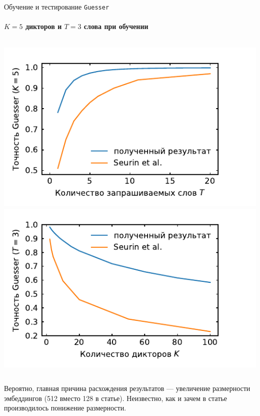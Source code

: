 \documentclass[aspectratio=43]{beamer}
\newcommand{\guesser}{\texttt{Guesser}}
\newcommand{\imgscale}{0.67}
\begin{document}
\begin{frame}[t]{Обучение и тестирование \guesser{}}
    \framesubtitle{$K = 5$ дикторов  и $T = 3$ слова при обучении}
    \begin{columns}
        \centering
        \includegraphics[scale=\imgscale]{../plots/word_sweep.pdf}
        \includegraphics[scale=\imgscale]{../plots/guest_sweep.pdf}
    \end{columns}\vspace*{1em}

    Вероятно, главная причина расхождения результатов --- увеличение размерности
    эмбеддингов (512 вместо 128 в статье). Неизвестно, как и зачем в статье
    производилось понижение размерности.
\end{frame}
\end{document}
